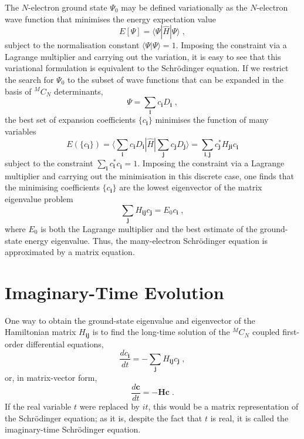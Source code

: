 \documentclass{article}
\newcommand{\bi}{\boldsymbol{i}}
\newcommand{\bj}{\boldsymbol{j}}
\newcommand{\bH}{\boldsymbol{H}}
\newcommand{\bc}{\boldsymbol{c}}
\begin{document}
The $N$-electron ground state $\Psi_0$ may be defined variationally as
the $N$-electron wave function that minimises the energy expectation
value
\begin{displaymath}
E[\Psi] = \langle \Psi | \hat{H} | \Psi \rangle \;,
\end{displaymath}
subject to the normalisation constant $\langle \Psi | \Psi \rangle =
1$.  Imposing the constraint via a Lagrange multiplier and carrying
out the variation, it is easy to see that this variational formulation
is equivalent to the Schr\"{o}dinger equation. If we restrict the
search for $\Psi_0$ to the subset of wave functions that can be
expanded in the basis of $^MC_N$ determinants,
\begin{displaymath}
\Psi = \sum_{\bi} c_{\bi} D_{\bi} \;,
\end{displaymath}
the best set of expansion coefficients $\{ c_{\bi} \}$ minimises the
function of many variables
\begin{displaymath}
E(\{c_{\bi}\}) = \langle {\textstyle \sum_{\bi}} c_{\bi} D_{\bi} | \hat{H} |
  {\textstyle \sum_{\bj}} c_{\bj} D_{\bj} \rangle = 
  {\textstyle \sum_{\bi, \bj}} c_{\bj}^{\ast} H_{\bj\bi}^{\,}
  c_{\bi}^{\,}
\end{displaymath}
subject to the constraint $\sum_{\bi} c_{\bi}^{\ast} c_{\bi}^{\,} =
1$.  Imposing the constraint via a Lagrange multiplier and carrying
out the minimisation in this discrete case, one finds that the
minimising coefficients $\{ c_{\bi} \}$ are the lowest eigenvector of
the matrix eigenvalue problem
\begin{displaymath}
\sum_{\bj} H_{\bi\bj}c_{\bj} = E_0 c_{\bi} \;,
\end{displaymath}
where $E_0$ is both the Lagrange multiplier and the best estimate of
the ground-state energy eigenvalue.  Thus, the many-electron
Schr\"{o}dinger equation is approximated by a matrix equation.

\section{Imaginary-Time Evolution}
\label{sec:ImaginaryTimeEvolution}

One way to obtain the ground-state eigenvalue and eigenvector of the
Hamiltonian matrix $H_{\bi\bj}$ is to find the long-time solution of
the $^MC_N$ coupled first-order differential equations,
\begin{displaymath}
\frac{d c_{\bi}}{dt} = - \sum_{\bj} H_{\bi\bj} c_{\bj} \;,
\end{displaymath}
or, in matrix-vector form,
\begin{displaymath}
\frac{d \bc}{dt} = - \bH \bc \;.
\end{displaymath}
If the real variable $t$ were replaced by $it$, this would be a matrix
representation of the Schr\"{o}dinger equation; as it is, despite the
fact that $t$ is real, it is called the imaginary-time Schr\"{o}dinger
equation.
\end{document}
